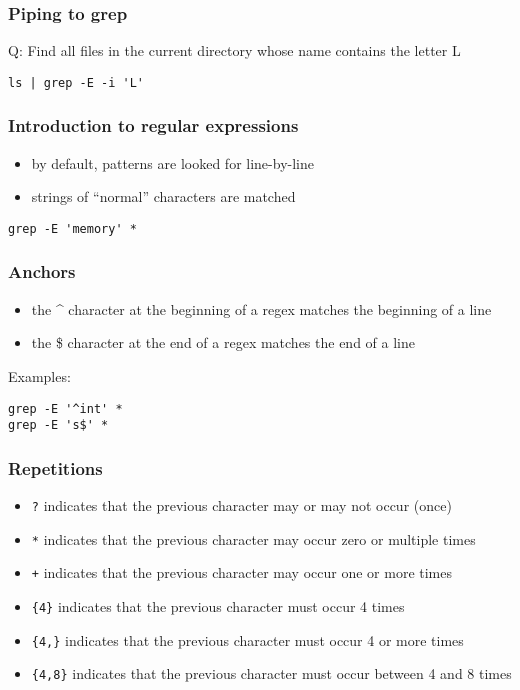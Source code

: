 \documentclass[12pt]{article}
\begin{document}
\subsubsection{Piping to grep}

Q: Find all files in the current directory whose name contains the letter L

\begin{lstlisting}
ls | grep -E -i 'L'
\end{lstlisting}

\subsubsection{Introduction to regular expressions}

\begin{itemize}
  \item by default, patterns are looked for line-by-line
  \item strings of “normal” characters are matched
\end{itemize}

\begin{lstlisting}
grep -E 'memory' *
\end{lstlisting}

\subsubsection{Anchors}

\begin{itemize}
  \item the \^{} character at the beginning of a regex matches the beginning of a line
  \item the \$ character at the end of a regex matches the end of a line
\end{itemize}

Examples:

\begin{lstlisting}
grep -E '^int' *
grep -E 's$' *
\end{lstlisting}

\subsubsection{Repetitions}

\begin{itemize}
    \item \texttt{?} indicates that the previous character may or may not occur (once)
    \item \texttt{*} indicates that the previous character may occur zero or multiple times
    \item \texttt{+} indicates that the previous character may occur one or more times
    \item \texttt{\{4\}} indicates that the previous character must occur 4 times
    \item \texttt{\{4,\}} indicates that the previous character must occur 4 or more times
    \item \texttt{\{4,8\}} indicates that the previous character must occur between 4 and 8 times
\end{itemize}
\end{document}
